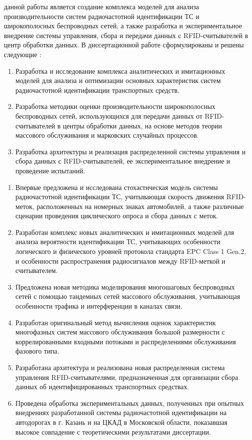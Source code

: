 {\aim} данной работы является создание комплекса моделей для анализа производительности систем радиочастотной идентификации ТС и широкополосных беспроводных сетей, а также разработка и экспериментальное внедрение системы управления, сбора и передачи данных с RFID-считывателей в центр обработки данных. В диссертационной работе сформулированы и решены следующие {\tasks}:
\begin{enumerate}[beginpenalty=10000] %
  \item Разработка и исследование комплекса аналитических и имитационных моделей для анализа и оптимизации основных характеристик систем радиочастотной идентификации транспортных средств.
  \item Разработка методики оценки производительности широкополосных беспроводных сетей, использующихся для передачи данных от RFID-считывателей в центры обработки данных, на основе методов теории массового обслуживания и марковских случайных процессов.
  \item Разработка архитектуры и реализация распределенной системы управления и сбора данных с RFID-считывателей, ее экспериментальное внедрение и проведение испытаний.
\end{enumerate}


{\novelty}
\begin{enumerate}[beginpenalty=10000] %
  \item Впервые предложена и исследована стохастическая модель системы радиочастотной идентификации ТС, учитывающая скорость движения RFID-меток, расположенных на номерных знаках автомобилей, а также различные сценарии проведения циклического опроса и сбора данных с меток.
  \item Разработан комплекс новых аналитических и имитационных моделей для анализа вероятности идентификации ТС, учитывающих особенности логического и физического уровней протокола стандарта EPC Class 1 Gen.2, и особенности распространения радиосигналов между RFID-меткой и считывателем.
  \item Предложена новая методика моделирования многошаговых беспроводных сетей с помощью тандемных сетей массового обслуживания, учитывающая особенности трафика и интерференции в каналах связи.
  \item Разработан оригинальный метод вычисления оценок характеристик многофазных систем массового обслуживания большой размерности с коррелированными входными потоками и распределениями обслуживания фазового типа.
  \item Разработана архитектура и реализована новая распределенная система управления RFID-считывателями, предназначенная для организации сбора данных об идентифицированных транспортных средствах.
  \item Проведена обработка экспериментальных данных, полученных при опытных внедрениях разработанной системы радиочастотной идентификации на автодорогах в г. Казань и на ЦКАД в Московской области, показавшая высокое совпадение с теоретическими результатами диссертации.
\end{enumerate}

